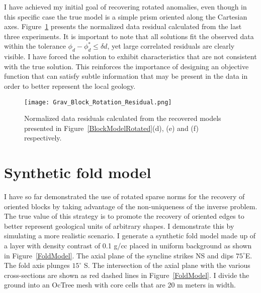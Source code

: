 I have achieved my initial goal of recovering rotated anomalies, even though in this specific case the true model is a simple prism oriented along the Cartesian axes.
Figure~\ref{BlockModelRotatedResiduals} presents the normalized data residual calculated from the last three experiments. It is important to note that all solutions fit the observed data within the tolerance $\phi_d - \phi_d^* \leq \delta d$, yet large correlated residuals are clearly visible. I have forced the solution to exhibit characteristics that are not consistent with the true solution. This reinforces the importance of designing an objective function that can satisfy subtle information that may be present in the data in order to better represent the local geology.
\begin{figure}[h!]
\texttt{[image: Grav\_Block\_Rotation\_Residual.png]}
\caption{Normalized data residuals calculated from the recovered models presented in Figure~\ref{BlockModelRotated}(d), (e) and (f) respectively.}
\label{BlockModelRotatedResiduals}
\end{figure}

\section{Synthetic fold model}
I have so far demonstrated the use of rotated sparse norms for the recovery of oriented blocks by taking advantage of the non-uniqueness of the inverse problem.
The true value of this strategy is to promote the recovery of oriented edges to better represent geological units of arbitrary shapes.
I demonstrate this by simulating a more realistic scenario. I generate a synthetic fold model made up of a layer with density contrast of 0.1 g/cc placed in uniform background as shown in Figure~\ref{FoldModel}.
The axial plane of the syncline strikes NS and dips $75^\circ$E. The fold axis plunges $15^\circ$ S. The intersection of the axial plane with the various cross-sections are shown as red dashed lines in Figure~\ref{FoldModel}. I divide the ground into an OcTree mesh with core cells that are 20 m meters in width.

